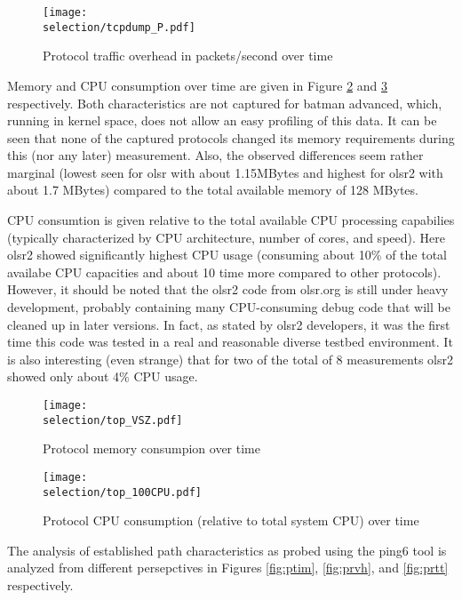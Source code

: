 \documentclass[a4paper,12pt,twoside]{article}
\begin{document}
\begin{figure}[!ht]
\centering
\texttt{[image: \\selection/tcpdump\_P.pdf]}
\caption{Protocol traffic overhead in packets/second over time}
\label{fig:traffic-ovhd-bytes}
\end{figure}



Memory and CPU consumption over time are given in Figure \ref{fig:mem}
and \ref{fig:cpu} respectively. Both characteristics are not captured
for batman advanced, which, running in kernel space, does not allow an
easy profiling of this data. It can be seen that none of the captured
protocols changed its memory requirements during this (nor any later)
measurement. Also, the observed differences seem rather marginal
(lowest seen for olsr with about 1.15MBytes and highest for olsr2 with
about 1.7 MBytes) compared to the total available memory of 128 MBytes.

CPU consumtion is given relative to the total available CPU processing
capabilies (typically characterized by CPU architecture, number of
cores, and speed). Here olsr2 showed significantly highest CPU usage
(consuming about 10\% of the total availabe CPU capacities and about
10 time more compared to other protocols). However, it should be noted
that the olsr2 code from olsr.org is still under heavy development,
probably containing many CPU-consuming debug code that will be cleaned
up in later versions. In fact, as stated by olsr2 developers, it was
the first time this code was tested in a real and reasonable diverse
testbed environment. It is also interesting (even strange) that for
two of the total of 8 measurements olsr2 showed only about 4\% CPU
usage.

\begin{figure}[!ht]
\centering
\texttt{[image: \\selection/top\_VSZ.pdf]}
\caption{Protocol memory consumpion over time}
\label{fig:mem}
\end{figure}

\begin{figure}[!ht]
\centering
\texttt{[image: \\selection/top\_100CPU.pdf]}
\caption{Protocol CPU consumption (relative to total system CPU) over time}
\label{fig:cpu}
\end{figure}


The analysis of established path characteristics as probed using the
ping6 tool is analyzed from different persepctives in Figures
\ref{fig:ptim}, \ref{fig:prvh}, and \ref{fig:prtt} respectively. 
\end{document}
